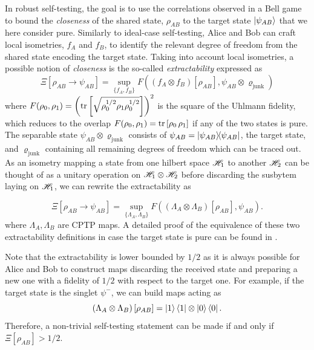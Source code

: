 In robust self-testing, the goal is to use the correlations observed in a Bell game to bound the \textit{closeness} of the shared state, $\rho_{AB}$ to the target state $\ket{\psi_{AB}}$ that we here consider pure.
Similarly to ideal-case self-testing, Alice and Bob can craft local isometries, $f_A$ and $f_B$, to identify the relevant degree of freedom from the shared state encoding the target state.
Taking into account local isometries, a possible notion of \textit{closeness} is the so-called \textit{extractability} expressed as
\begin{equation}
	\Xi [\rho_{AB} \rightarrow \psi_{AB}] = \sup_{\{f_A,f_B\}} F((f_A \otimes f_B)[\rho_{AB}],\psi_{AB} \otimes \varrho_\text{junk})
	\label{eq:extractability_junk}
\end{equation}
where $F(\rho_0,\rho_1) = \left(\trr{\sqrt{\rho_0^{1/2}\rho_1\rho_0^{1/2}}}\right)^2$ is the square of the Uhlmann fidelity, which reduces to the overlap $F(\rho_0,\rho_1)=\trr{\rho_0\,\rho_1}$ if any of the two states is pure.
The separable state $\psi_{AB} \otimes \varrho_\text{junk}$ consists of $\psi_{AB} = \ketbra{\psi_{AB}}$, the target state, and $\varrho_\text{junk}$ containing all remaining degrees of freedom which can be traced out.
As an isometry mapping a state from one hilbert space $\mathscr{H}_1$ to another $\mathscr{H}_2$ can be thought of as a unitary operation on $\mathscr{H}_1 \otimes \mathscr{H}_2$ before discarding the susbytem laying on $\mathscr{H}_1$, we can rewrite the extractability as
 
\begin{equation}
	\Xi [\rho_{AB} \rightarrow \psi_{AB}] = \sup_{\{\Lambda_A,\Lambda_B\}} F((\Lambda_A \otimes \Lambda_B)[\rho_{AB}],\psi_{AB}).
	\label{eq:extractability}
\end{equation}
where $\Lambda_A,\Lambda_B$ are \acrfull{CPTP} maps. 
A detailed proof of the equivalence of these two extractability definitions in case the target state is pure can be found in \cite{Sekatski2018}.


Note that the extractability is lower bounded by $1/2$ as it is always possible for Alice and Bob to construct maps discarding the received state and preparing a new one with a fidelity of $1/2$ with respect to the target one. 
For example, if the target state is the singlet $\psi^{-}$, we can build maps acting as
\begin{equation}	
	\left(\Lambda_A \otimes \Lambda_B\right)[\rho_{AB}] = \ket{1}\bra{1} \otimes \ket{0}\bra{0}.
\end{equation}
Therefore, a non-trivial self-testing statement can be made if and only if $\Xi[\rho_{AB}]>1/2$.


